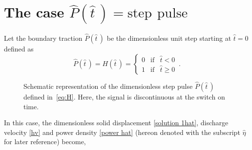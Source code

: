 \documentclass[12pt,a4paper]{amsart}
\theoremstyle{definition}
\newcommand{\hatt}{\hat{t}}
\newcommand{\heta}{\hat{\eta}}
\begin{document}
\section{The case $\hat{P}\left( \hatt\,\right) =\mathrm{step}$ $\mathrm{pulse}$}
\label{sec:step_pulse}
% 
% 
Let the boundary traction $\hat{P}\left( \hatt\,\right) $ be the dimensionless unit step starting at
$\hatt=0$ defined as
\begin{equation}\label{eq:H}
\hat{P}\left( \hat{t}\,\right) =H\left( \hat{t}\,\right) =\left\{
\begin{array}{lll}
0 & \text{if} & \hat{t}<0 \\
1 & \text{if} & \hat{t}\geq 0%
\end{array}%
\right. \,.
\end{equation}%
\begin{figure}[h!]
\begin{center}
\end{center}
\caption{Schematic representation of the dimensionless step pulse $\hat{P}(\hatt\,)$ defined in~\eqref{eq:H}. Here, the signal is discontinuous at the switch on time.}
\label{fig:step_pulse}
\end{figure}
In this case, the dimensionless solid displacement \eqref{solution 1hat}, discharge velocity \eqref{hv} and
power density \eqref{power hat} (hereon denoted with the subscript $\heta$ for later reference) become,
\end{document}
